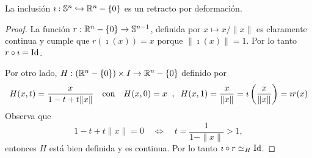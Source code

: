 \begin{ejercicio}\label{ej:78}
  La inclusi\'on $\imath:\mathbb{S}^n\hookrightarrow\mathbb{R}^n-\{0\}$ es un retracto por deformaci\'on.
\end{ejercicio}
\begin{proof}%
  La funci\'on $r:\mathbb{R}^n-\{0\}\rightarrow\mathbb{S}^{n-1}$, definida por $x\mapsto x/\|x\|$ es claramente
  continua y cumple que $r(\imath(x))=x$ porque $\|\imath(x)\|=1$. Por lo tanto $r\circ\imath=\text{Id}$.

  Por otro lado, $H:(\mathbb{R}^n-\{0\})\times I\rightarrow \mathbb{R}^n-\{0\}$ definido por
  \[
    H(x,t)=\frac{x}{1-t+t\|x\|} \quad\text{con}\quad
    H(x,0)=x \;\; , \;\; H(x,1)=\frac{x}{\|x\|}=\imath \left( \frac{x}{\|x\|} \right)=\imath r(x)
  \]
  Observa que
  \[
    1-t+t\|x\|=0 \quad\iff\quad t=\frac{1}{1-\|x\|}>1,
  \]
  entonces $H$ est\'a bien definida y es continua. Por lo tanto $\imath\circ r \simeq_H \text{Id}$.  
\end{proof}%

